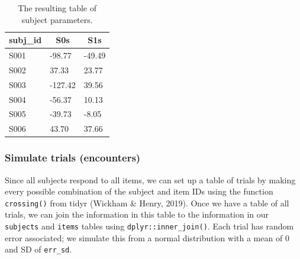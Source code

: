 \documentclass[doc,floatsintext]{apa6}
\newenvironment{Shaded}{\begin{snugshade}}{\end{snugshade}}
\newcommand{\KeywordTok}[1]{\textcolor[rgb]{0.13,0.29,0.53}{\textbf{#1}}}
\newcommand{\DataTypeTok}[1]{\textcolor[rgb]{0.13,0.29,0.53}{#1}}
\newcommand{\DecValTok}[1]{\textcolor[rgb]{0.00,0.00,0.81}{#1}}
\newcommand{\StringTok}[1]{\textcolor[rgb]{0.31,0.60,0.02}{#1}}
\newcommand{\CommentTok}[1]{\textcolor[rgb]{0.56,0.35,0.01}{\textit{#1}}}
\newcommand{\OperatorTok}[1]{\textcolor[rgb]{0.81,0.36,0.00}{\textbf{#1}}}
\newcommand{\NormalTok}[1]{#1}
\begin{document}
\begin{table}[H]
\begin{center}
\begin{threeparttable}
\caption{\label{tab:subj-table}The resulting table of subject parameters.}
\begin{tabular}{lll}
\toprule
subj\_id & \multicolumn{1}{c}{S0s} & \multicolumn{1}{c}{S1s}\\
\midrule
S001 & -98.77 & -49.49\\
S002 & 37.33 & 23.77\\
S003 & -127.42 & 39.56\\
S004 & -56.37 & 10.13\\
S005 & -39.73 & -8.05\\
S006 & 43.70 & 37.66\\
\bottomrule
\end{tabular}
\end{threeparttable}
\end{center}
\end{table}

\subsubsection{Simulate trials
(encounters)}\label{simulate-trials-encounters}

Since all subjects respond to all items, we can set up a table of trials
by making every possible combination of the subject and item IDs using
the function \texttt{crossing()} from tidyr (Wickham \& Henry, 2019).
Once we have a table of all trials, we can join the information in this
table to the information in our \texttt{subjects} and \texttt{items}
tables using \texttt{dplyr::inner\_join()}. Each trial has random error
associated; we simulate this from a normal distribution with a mean of 0
and SD of \texttt{err\_sd}.

\begin{Shaded}
\end{Shaded}
\end{document}
